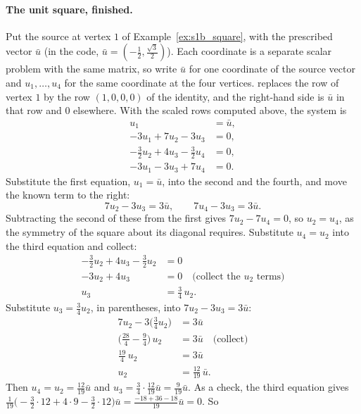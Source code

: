 \paragraph{The unit square, finished.} Put the source at vertex $1$ of Example~\ref{ex:s1b_square}, with the prescribed vector $\bar u$ (in the code, $\bar u = (-\frac12, \frac{\sqrt 3}{2})$). Each coordinate is a separate scalar problem with the same matrix, so write $\bar u$ for one coordinate of the source vector and $u_1, \ldots, u_4$ for the same coordinate at the four vertices.  replaces the row of vertex $1$ by the row $(1, 0, 0, 0)$ of the identity, and the right-hand side is $\bar u$ in that row and $0$ elsewhere. With the scaled rows computed above, the system is
\begin{align*}
u_1 &= \bar u , \\
-3u_1 + 7u_2 - 3u_3 &= 0 , \\
-\tfrac32 u_2 + 4u_3 - \tfrac32 u_4 &= 0 , \\
-3u_1 - 3u_3 + 7u_4 &= 0 .
\end{align*}
Substitute the first equation, $u_1 = \bar u$, into the second and the fourth, and move the known term to the right:
\begin{equation*}
7u_2 - 3u_3 = 3\bar u, \qquad 7u_4 - 3u_3 = 3\bar u .
\end{equation*}
Subtracting the second of these from the first gives $7u_2 - 7u_4 = 0$, so $u_2 = u_4$, as the symmetry of the square about its diagonal requires. Substitute $u_4 = u_2$ into the third equation and collect:
\begin{align*}
-\tfrac32 u_2 + 4u_3 - \tfrac32 u_2 &= 0 \\
-3u_2 + 4u_3 &= 0 \quad \text{(collect the } u_2 \text{ terms)}\\
u_3 &= \tfrac34\, u_2 .
\end{align*}
Substitute $u_3 = \frac34 u_2$, in parentheses, into $7u_2 - 3u_3 = 3\bar u$:
\begin{align*}
7u_2 - 3\big(\tfrac34 u_2\big) &= 3\bar u \\
\big(\tfrac{28}{4} - \tfrac{9}{4}\big)\, u_2 &= 3\bar u \quad \text{(collect)}\\
\tfrac{19}{4}\, u_2 &= 3\bar u \\
u_2 &= \tfrac{12}{19}\,\bar u .
\end{align*}
Then $u_4 = u_2 = \frac{12}{19}\bar u$ and $u_3 = \frac34\cdot\frac{12}{19}\bar u = \frac{9}{19}\bar u$. As a check, the third equation gives $\frac{1}{19}\big(-\frac32\cdot 12 + 4\cdot 9 - \frac32\cdot 12\big)\bar u = \frac{-18 + 36 - 18}{19}\bar u = 0$. So
